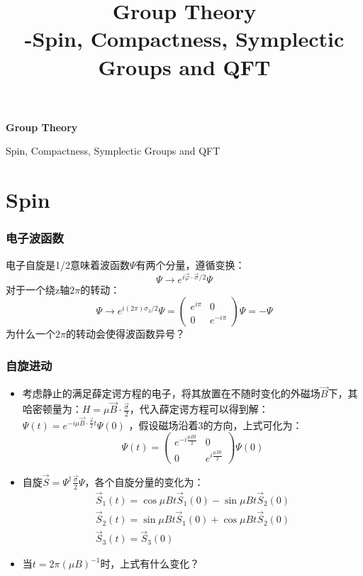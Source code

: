 \documentclass[CJK]{beamer}
\title{Group Theory\\ -Spin, Compactness, Symplectic Groups and QFT}
\author{}
\date{}
\begin{document}
\begin{frame}
 
\begin{center}
\begin{Large}
\bch
{\bf Group Theory}

{\vskip 0.3in}

Spin, Compactness, Symplectic Groups and QFT

\ech
\end{Large}
\end{center}


\end{frame}

\section{Spin}
\begin{frame}
\frametitle{\bch 电子波函数 \ech}
\bch
电子自旋是1/2意味着波函数$\varPsi$有两个分量，遵循变换：
$$
\varPsi \rightarrow e^{i \vec{\varphi} \cdot \vec{\sigma} / 2} \varPsi
$$
对于一个绕z轴$2\pi$的转动：
$$
\varPsi \rightarrow e^{i(2 \pi) \sigma_{3} / 2} \varPsi=\left(\begin{array}{cc}{e^{i \pi}} & {0} \\ {0} & {e^{-i \pi}}\end{array}\right) \varPsi=-\varPsi
$$
为什么一个$2\pi$的转动会使得波函数异号？
\ech
\end{frame}



\begin{frame}
\frametitle{\bch 自旋进动 \ech}
\bch
\begin{itemize}
\item 考虑静止的满足薛定谔方程的电子，将其放置在不随时变化的外磁场$\vec{B}$下，其哈密顿量为：$H=\mu \vec{B} \cdot \frac{\vec{\sigma}}{2}$，代入薛定谔方程可以得到解：$\varPsi(t)=e^{-i \mu \vec{B} \cdot \frac{\vec{\sigma}}{2} t} \varPsi(0)$
，假设磁场沿着3的方向，上式可化为：
$$
\varPsi(t)=\left(\begin{array}{cc}{e^{-i \frac{\mu B t}{2}}} & {0} \\ {0} & {e^{i \frac{\mu B t}{2}}}\end{array}\right) \varPsi(0)
$$
\item 自旋$\vec{S}=\varPsi^{\dagger} \frac{\vec{\sigma}}{2} \varPsi$，各个自旋分量的变化为：
$$
\begin{array}{l}{\vec{S}_{1}(t)=\cos \mu B t \vec{S}_{1}(0)-\sin \mu B t \vec{S}_{2}(0)} \\ {\vec{S}_{2}(t)=\sin \mu B t \vec{S}_{1}(0)+\cos \mu B t \vec{S}_{2}(0)} \\ {\vec{S}_{3}(t)=\vec{S}_{3}(0)}\end{array}
$$
\item 当$t=2 \pi(\mu B)^{-1}$时，上式有什么变化？
\end{itemize}
\ech
\end{frame}
\end{document}
